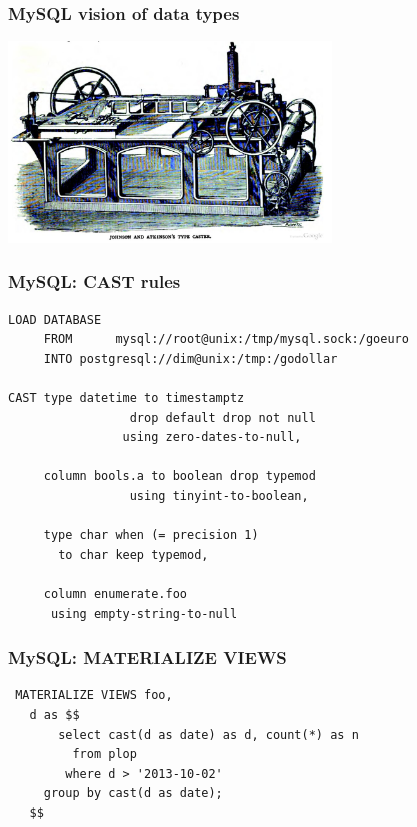 \documentclass{beamer}
\begin{document}
\begin{frame}
  \frametitle{MySQL vision of data types}

  
  \begin{center}
    \includegraphics[height=2.1in]{type-casting-machine.jpg}
  \end{center}
\end{frame}

\begin{frame}[fragile]
  \frametitle{MySQL: CAST rules}

\begin{verbatim}
LOAD DATABASE
     FROM      mysql://root@unix:/tmp/mysql.sock:/goeuro
     INTO postgresql://dim@unix:/tmp:/godollar

CAST type datetime to timestamptz
                 drop default drop not null
                using zero-dates-to-null,

     column bools.a to boolean drop typemod
                 using tinyint-to-boolean,

     type char when (= precision 1)
       to char keep typemod,

     column enumerate.foo
      using empty-string-to-null
\end{verbatim}
\end{frame}

\begin{frame}[fragile]
  \frametitle{MySQL: MATERIALIZE VIEWS}

  \vfill
  
\begin{verbatim}
 MATERIALIZE VIEWS foo,
   d as $$
       select cast(d as date) as d, count(*) as n
         from plop
        where d > '2013-10-02'
     group by cast(d as date);
   $$
\end{verbatim}
\end{frame}
\end{document}
